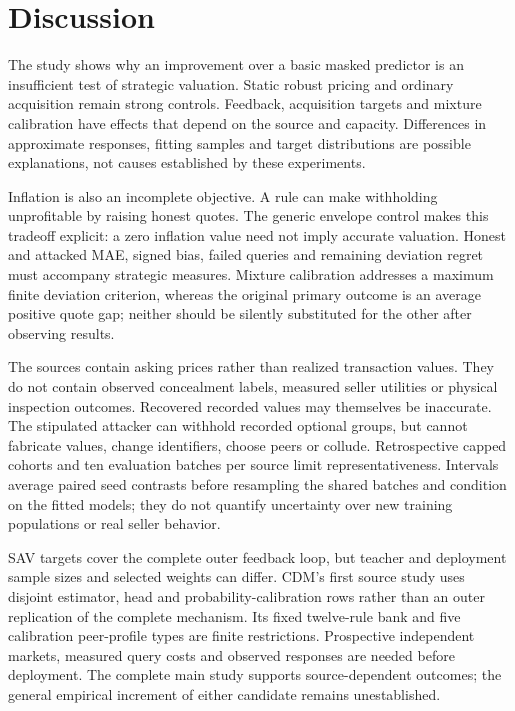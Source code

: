 \documentclass[pdflatex,sn-nature]{sn-jnl}
\begin{document}
\section{Discussion}
The study shows why an improvement over a basic masked predictor is an
insufficient test of strategic valuation. Static robust pricing and ordinary
acquisition remain strong controls. Feedback, acquisition targets and mixture
calibration have effects that depend on the source and capacity. Differences
in approximate responses, fitting samples and target distributions are possible
explanations, not causes established by these experiments.

Inflation is also an incomplete objective. A rule can make withholding
unprofitable by raising honest quotes. The generic envelope control makes this
tradeoff explicit: a zero inflation value need not imply accurate valuation.
Honest and attacked MAE, signed bias, failed queries and remaining deviation
regret must accompany strategic measures. Mixture calibration addresses a
maximum finite deviation criterion, whereas the original primary outcome is
an average positive quote gap; neither should be silently substituted for
the other after observing results.

The sources contain asking prices rather than realized transaction values.
They do not contain observed concealment labels, measured seller utilities or
physical inspection outcomes. Recovered recorded values may themselves be
inaccurate. The stipulated attacker can withhold recorded optional groups,
but cannot fabricate values, change identifiers, choose peers or collude.
Retrospective capped cohorts and ten evaluation batches per source limit
representativeness. Intervals average paired seed contrasts before resampling
the shared batches and condition on the fitted models; they do not quantify
uncertainty over new training populations or real seller behavior.

SAV targets cover the complete outer feedback loop, but teacher and deployment
sample sizes and selected weights can differ. CDM's first source study uses
disjoint estimator, head and probability-calibration rows rather than an outer
replication of the complete mechanism. Its fixed twelve-rule bank and five
calibration peer-profile types are finite restrictions. Prospective independent
markets, measured query costs and observed responses are needed before
deployment. The complete main study supports source-dependent outcomes; the
general empirical increment of either candidate remains unestablished.
\end{document}
